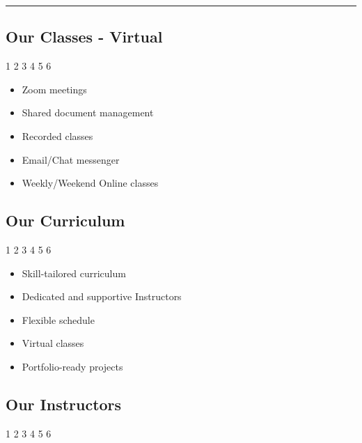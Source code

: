 \documentclass[
  letterpaper,
  DIV=11,
  numbers=noendperiod]{scrartcl}
\providecommand{\tightlist}{%
  \setlength{\itemsep}{0pt}\setlength{\parskip}{0pt}}\usepackage{longtable,booktabs,array}
\begin{document}
\begin{center}\rule{0.5\linewidth}{0.5pt}\end{center}

\hypertarget{our-classes---virtual}{%
\subsection{Our Classes - Virtual}\label{our-classes---virtual}}

{1} 2 {3 4 5 6}

\begin{itemize}
\tightlist
\item
  Zoom meetings
\item
  Shared document management
\item
  Recorded classes
\item
  Email/Chat messenger
\item
  Weekly/Weekend Online classes
\end{itemize}

\hypertarget{our-curriculum}{%
\subsection{Our Curriculum}\label{our-curriculum}}

{1} 2 {3 4 5 6}

\begin{itemize}
\tightlist
\item
  Skill-tailored curriculum
\item
  Dedicated and supportive Instructors
\item
  Flexible schedule
\item
  Virtual classes
\item
  Portfolio-ready projects
\end{itemize}

\hypertarget{our-instructors}{%
\subsection{Our Instructors}\label{our-instructors}}

{1} 2 {3 4 5 6}
\end{document}
